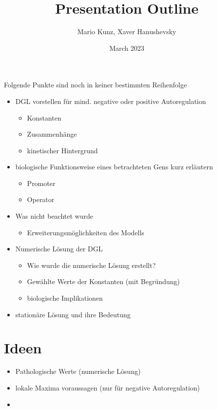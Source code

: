 \documentclass{article}
\title{Presentation Outline}
\author{Mario Kunz, Xaver Hanushevsky}
\date{March 2023}
\begin{document}
Folgende Punkte sind noch in keiner bestimmten Reihenfolge

\begin{itemize}
    \item DGL vorstellen für mind. negative oder positive Autoregulation
    \begin{itemize}
        \item Konstanten
        \item Zusammenhänge
        \item kinetischer Hintergrund
    \end{itemize}
    \item biologische Funktionsweise eines betrachteten Gens kurz erläutern
    \begin{itemize}
        \item Promoter
        \item Operator
    \end{itemize}
    \item Was nicht beachtet wurde
    \begin{itemize}
        \item Erweiterungsmöglichkeiten des Modells
    \end{itemize}
    \item Numerische Lösung der DGL
    \begin{itemize}
        \item Wie wurde die numerische Lösung erstellt?
        \item Gewählte Werte der Konstanten (mit Begründung)
        \item biologische Implikationen
    \end{itemize}
    \item stationäre Lösung und ihre Bedeutung
\end{itemize}

\section{Ideen}
\begin{itemize}
    \item Pathologische Werte (numerische Lösung)
    \item lokale Maxima voraussagen (nur für negative Autoregulation)
    \item 
\end{itemize}
\end{document}
